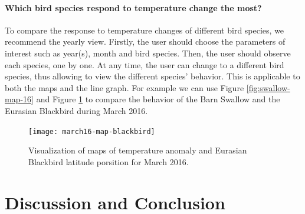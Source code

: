 \documentclass[journal]{vgtc}                %
\begin{document}
\paragraph{Which bird species respond to temperature change the most?}

To compare the response to temperature changes of different bird species, we recommend the yearly view. Firstly, the user should choose the parameters of interest such as year(s), month and bird species. Then, the user should observe each species, one by one. At any time, the user can change to a different bird species, thus allowing to view the different species' behavior. This is applicable to both the maps and the line graph. For example we can use Figure \ref{fig:swallow-map-16} and Figure \ref{fig:march16-map-blackbird} to compare the behavior of the Barn Swallow and the Eurasian Blackbird during March 2016.

\begin{figure}[h]
  \centering
  \texttt{[image: march16-map-blackbird]}
  \caption{Visualization of maps of temperature anomaly and Eurasian Blackbird latitude porsition for March 2016.}
  \label{fig:march16-map-blackbird}
\end{figure}

\section{Discussion and Conclusion}




\end{document}
